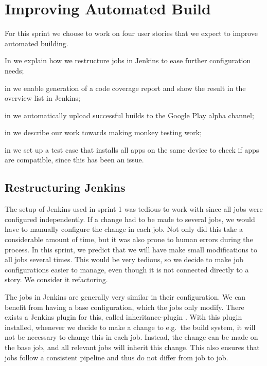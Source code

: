 \chapter{Improving Automated Build}
For this sprint we choose to work on four user stories that we expect to improve automated building.

\begin{chapterorganization}
  \item In  we explain how we restructure jobs in Jenkins to ease further configuration needs;
  \item in  we enable generation of a code coverage report and show the result in the overview list in Jenkins;
  \item in  we automatically upload successful builds to the Google Play alpha channel;
  \item in  we describe our work towards making monkey testing work;
  \item in  we set up a test case that installs all apps on the same device to check if apps are compatible, since this has been an issue.
\end{chapterorganization}

\section{Restructuring Jenkins}\label{sec:jenkins_restruct}
The setup of Jenkins used in sprint 1 was tedious to work with since all jobs were configured independently. If a change had to be made to several jobs, we would have to manually configure the change in each job. Not only did this take a considerable amount of time, but it was also prone to human errors during the process. In this sprint, we predict that we will have make small modifications to all jobs several times. This would be very tedious, so we decide to make job configurations easier to manage, even though it is not connected directly to a story. We consider it refactoring.

The jobs in Jenkins are generally very similar in their configuration. We can benefit from having a base configuration, which the jobs only modify. There exists a Jenkins plugin for this, called inheritance-plugin \parencite{jenkins-inheritance}. With this plugin installed, whenever we decide to make a change to e.g.\ the build system, it will not be necessary to change this in each job. Instead, the change can be made on the base job, and all relevant jobs will inherit this change. This also ensures that jobs follow a consistent pipeline and thus do not differ from job to job.

